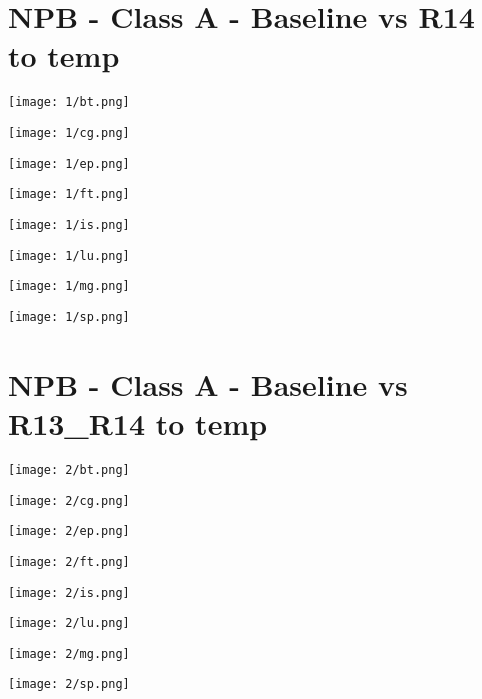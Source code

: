 \documentclass[11pt]{article}
\begin{document}
\section*{NPB - Class A - Baseline vs R14 to temp}

\texttt{[image: 1/bt.png]}\par\vspace{0,5cm}
\texttt{[image: 1/cg.png]}\par\vspace{0,5cm}
\texttt{[image: 1/ep.png]}\par\vspace{0,5cm}
\texttt{[image: 1/ft.png]}\par\vspace{0,5cm}
\texttt{[image: 1/is.png]}\par\vspace{0,5cm}
\texttt{[image: 1/lu.png]}\par\vspace{0,5cm}
\texttt{[image: 1/mg.png]}\par\vspace{0,5cm}
\texttt{[image: 1/sp.png]}\par\vspace{0,5cm}

\section*{NPB - Class A - Baseline vs R13\_R14 to temp}

\texttt{[image: 2/bt.png]}\par\vspace{0,5cm}
\texttt{[image: 2/cg.png]}\par\vspace{0,5cm}
\texttt{[image: 2/ep.png]}\par\vspace{0,5cm}
\texttt{[image: 2/ft.png]}\par\vspace{0,5cm}
\texttt{[image: 2/is.png]}\par\vspace{0,5cm}
\texttt{[image: 2/lu.png]}\par\vspace{0,5cm}
\texttt{[image: 2/mg.png]}\par\vspace{0,5cm}
\texttt{[image: 2/sp.png]}\par\vspace{0,5cm}
\end{document}
